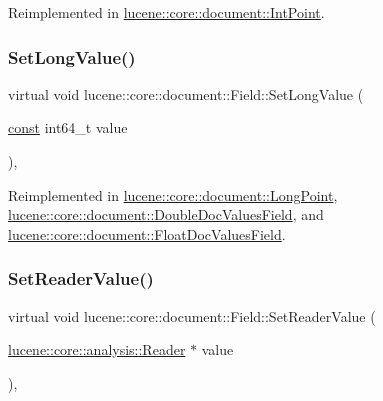 Reimplemented in \mbox{\hyperlink{classlucene_1_1core_1_1document_1_1IntPoint_a49cd2286ec4ffa46d868eea812d85234}{lucene\+::core\+::document\+::\+Int\+Point}}.

\mbox{\label{classlucene_1_1core_1_1document_1_1Field_a949822599f392fb7fca20423902e535a}} 
\subsubsection{\texorpdfstring{Set\+Long\+Value()}{SetLongValue()}}
{\footnotesize\ttfamily virtual void lucene\+::core\+::document\+::\+Field\+::\+Set\+Long\+Value (\begin{DoxyParamCaption}\item[{\mbox{\hyperlink{ZlibCrc32_8h_a2c212835823e3c54a8ab6d95c652660e}{const}} int64\+\_\+t}]{value }\end{DoxyParamCaption})\hspace{0.3cm}{\ttfamily [inline]}, {\ttfamily [virtual]}}



Reimplemented in \mbox{\hyperlink{classlucene_1_1core_1_1document_1_1LongPoint_a5bc668dfdf190b8bc0a52808a6580b40}{lucene\+::core\+::document\+::\+Long\+Point}}, \mbox{\hyperlink{classlucene_1_1core_1_1document_1_1DoubleDocValuesField_ab51b275ef2d23c248e945f4747a6dd6e}{lucene\+::core\+::document\+::\+Double\+Doc\+Values\+Field}}, and \mbox{\hyperlink{classlucene_1_1core_1_1document_1_1FloatDocValuesField_a27b6b009471cbaa1b0baf8facb97fa6d}{lucene\+::core\+::document\+::\+Float\+Doc\+Values\+Field}}.

\mbox{\label{classlucene_1_1core_1_1document_1_1Field_a86a255eb3b09b70fe76af3b7d75364e5}} 
\subsubsection{\texorpdfstring{Set\+Reader\+Value()}{SetReaderValue()}}
{\footnotesize\ttfamily virtual void lucene\+::core\+::document\+::\+Field\+::\+Set\+Reader\+Value (\begin{DoxyParamCaption}\item[{\mbox{\hyperlink{classlucene_1_1core_1_1analysis_1_1Reader}{lucene\+::core\+::analysis\+::\+Reader}} $\ast$}]{value }\end{DoxyParamCaption})\hspace{0.3cm}{\ttfamily [inline]}, {\ttfamily [virtual]}}

